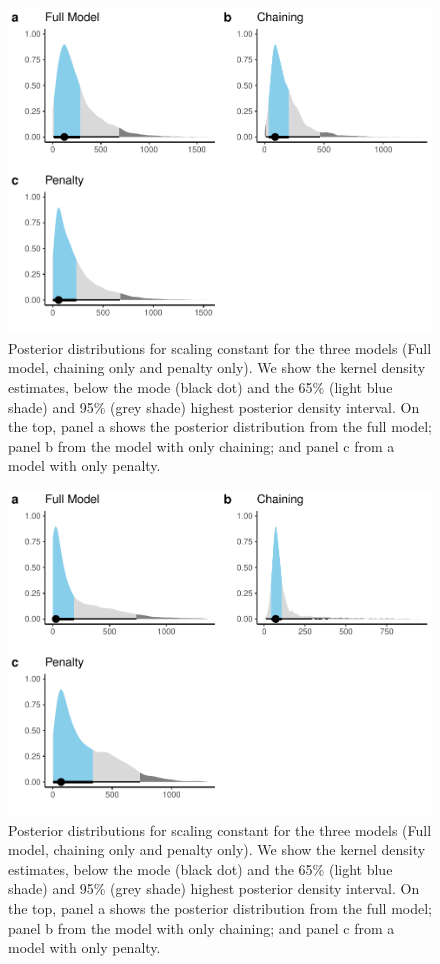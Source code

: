 \documentclass[
  12pt,
]{article}
\begin{document}
\begin{figure}[H]
\includegraphics[width=0.95\linewidth,]{manuscript_BE_files/figure-latex/scaConstFAA-1} \caption{Posterior distributions for scaling constant for the three models (Full model, chaining only and penalty only). We show the kernel density estimates, below the mode (black dot) and the 65\% (light blue shade) and 95\% (grey shade)  highest posterior density interval. On the top, panel a shows the posterior distribution from the full model; panel b from the model with only chaining; and panel c from a model with only penalty.}\label{fig:scaConstFAA}
\end{figure}

\begin{figure}[H]
\includegraphics[width=0.95\linewidth,]{manuscript_BE_files/figure-latex/scaConstPAA-1} \caption{Posterior distributions for scaling constant for the three models (Full model, chaining only and penalty only). We show the kernel density estimates, below the mode (black dot) and the 65\% (light blue shade) and 95\% (grey shade)  highest posterior density interval. On the top, panel a shows the posterior distribution from the full model; panel b from the model with only chaining; and panel c from a model with only penalty.}\label{fig:scaConstPAA}
\end{figure}
\end{document}
